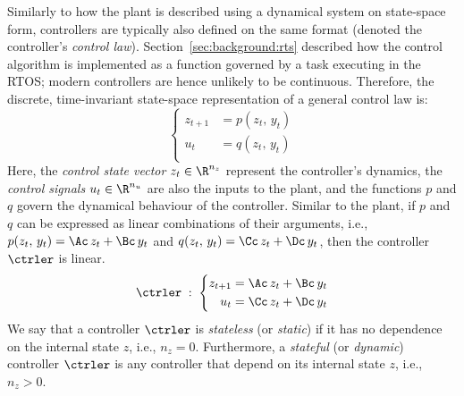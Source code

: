Similarly to how the plant is described using a dynamical system on state-space form, controllers are typically also defined on the same format (denoted the controller's \emph{control law}).
Section~\ref{sec:background:rts} described how the control algorithm is implemented as a function governed by a task executing in the RTOS; modern controllers are hence unlikely to be continuous.
Therefore, the discrete, time-invariant state-space representation of a general control law is:
%
\begin{equation}%
    \label{eq:discrete-state-space}%
    \left\{\begin{aligned}
        z_{t+1} &= p(z_t,\, y_t) \\
        u_t &= q(z_t,\, y_t) \\
    \end{aligned}\right.
\end{equation}
%
Here, the \emph{control state vector} $z_t \in \R^{n_z}$ represent the controller's dynamics, the \emph{control signals} $u_t \in \R^{n_u}$ are also the inputs to the plant, and the functions $p$ and $q$ govern the dynamical behaviour of the controller.
Similar to the plant, if $p$ and $q$ can be expressed as linear combinations of their arguments, i.e., $p(z_t,\, y_t) = \Ac\,z_t+\Bc\,y_t$ and $q(z_t,\, y_t) = \Cc\,z_t+\Dc\,y_t$, then the controller $\ctrler$ is linear.
%
\begin{equation}%
    \label{eq:discrete-lti-ctrler}%
    \ctrler \; : \; \left\{\begin{aligned}
        z_{t+1} &= \Ac\,z_t + \Bc\,y_t \\
        u_t &= \Cc\,z_t + \Dc\,y_t \\
    \end{aligned}\right.
\end{equation}
%
We say that a controller $\ctrler$ is \emph{stateless} (or \emph{static}) if it has no dependence on the internal state $z$, i.e., $n_z = 0$.
Furthermore, a \emph{stateful} (or \emph{dynamic}) controller $\ctrler$ is any controller that depend on its internal state $z$, i.e., $n_z > 0$.

